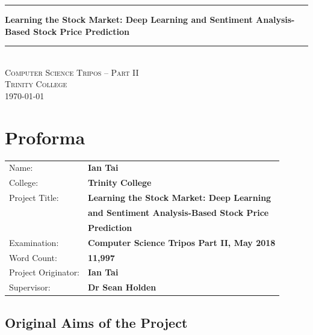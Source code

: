 \documentclass[12pt,a4paper,twoside,openright]{report}
\begin{document}





\thispagestyle{empty}
\vspace*{50mm}
\begin{center}
\rule{\linewidth}{1pt}\vspace{5mm}
\LARGE\textbf{Learning the Stock Market: Deep Learning and Sentiment
Analysis-Based Stock Price Prediction}
\rule{\linewidth}{1pt} \\[10mm]
\Large\textsc{Computer Science Tripos -- Part II \\[5mm]
Trinity College \\[5mm]
\today}  %
\end{center}

\pagestyle{plain}
\setcounter{page}{1} 
\chapter*{Proforma}
{\large
\begin{tabular}{ll}
Name:               & \bf Ian Tai                      \\[-2pt]
College:            & \bf Trinity College                     \\[-2pt]
Project Title:      & \bf Learning the Stock Market: Deep Learning \\[-2pt]
& \bf and Sentiment Analysis-Based Stock Price\\[-2pt]
& \bf Prediction \\[-3pt]
Examination:        & \bf Computer Science Tripos Part II, May 2018  \\[-2pt]
Word Count:         & \bf 11,997\footnotemark \\[-3pt]
Project Originator: & \bf Ian Tai                    \\[-2pt]
Supervisor:         & \bf Dr Sean Holden                    
\end{tabular}
}



\section*{Original Aims of the Project}
\end{document}
